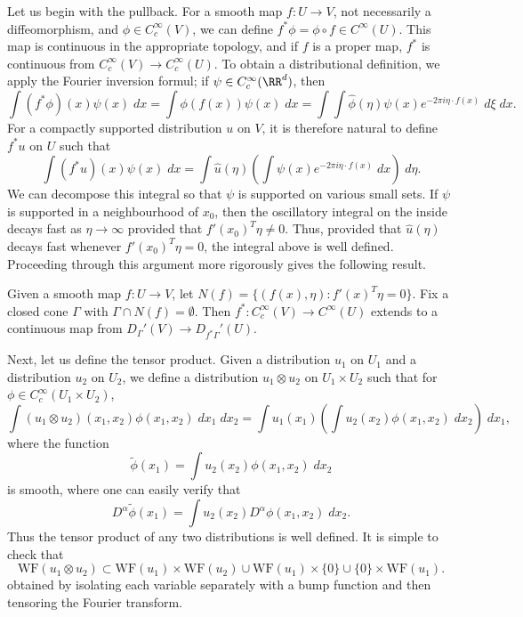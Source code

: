 Let us begin with the pullback. For a smooth map $f: U \to V$, not necessarily a diffeomorphism, and $\phi \in C_c^\infty(V)$, we can define $f^* \phi = \phi \circ f \in C^\infty(U)$. This map is continuous in the appropriate topology, and if $f$ is a proper map, $f^*$ is continuous from $C_c^\infty(V) \to C_c^\infty(U)$. To obtain a distributional definition, we apply the Fourier inversion formul; if $\psi \in C_c^\infty(\RR^d)$, then
%
\[ \int (f^* \phi)(x) \psi(x)\; dx = \int \phi(f(x)) \psi(x)\; dx = \int \int \widehat{\phi}(\eta) \psi(x) e^{-2 \pi i \eta \cdot f(x)}\; d\xi\; dx. \]
%
For a compactly supported distribution $u$ on $V$, it is therefore natural to define $f^* u$ on $U$ such that
%
\[ \int (f^* u)(x) \psi(x)\; dx = \int \widehat{u}(\eta) \left( \int \psi(x) e^{-2 \pi i \eta \cdot f(x)}\; dx \right)\; d\eta. \]
%
We can decompose this integral so that $\psi$ is supported on various small sets. If $\psi$ is supported in a neighbourhood of $x_0$, then the oscillatory integral on the inside decays fast as $\eta \to \infty$ provided that $f'(x_0)^T \eta \neq 0$. Thus, provided that $\widehat{u}(\eta)$ decays fast whenever $f'(x_0)^T \eta = 0$, the integral above is well defined. Proceeding through this argument more rigorously gives the following result.

\begin{theorem}
    Given a smooth map $f: U \to V$, let $N(f) = \{ (f(x),\eta): f'(x)^T \eta = 0 \}$. Fix a closed cone $\Gamma$ with $\Gamma \cap N(f) = \emptyset$. Then $f^*: C_c^\infty(V) \to C^\infty(U)$ extends to a continuous map from $D_\Gamma'(V) \to D_{f^* \Gamma}'(U)$.
\end{theorem}

Next, let us define the tensor product. Given a distribution $u_1$ on $U_1$ and a distribution $u_2$ on $U_2$, we define a distribution $u_1 \otimes u_2$ on $U_1 \times U_2$ such that for $\phi \in C_c^\infty(U_1 \times U_2)$,
%
\[ \int (u_1 \otimes u_2)(x_1,x_2) \phi(x_1,x_2)\; dx_1\; dx_2 = \int u_1(x_1) \left( \int u_2(x_2) \phi(x_1,x_2)\; dx_2 \right)\; dx_1, \]
%
where the function
%
\[ \tilde{\phi}(x_1) = \int u_2(x_2) \phi(x_1,x_2)\; dx_2 \]
%
is smooth, where one can easily verify that
%
\[ D^\alpha \tilde{\phi}(x_1) = \int u_2(x_2) D^\alpha \phi(x_1,x_2)\; dx_2. \]
%
Thus the tensor product of any two distributions is well defined. It is simple to check that
%
\[ \text{WF}(u_1 \otimes u_2) \subset \text{WF}(u_1) \times \text{WF}(u_2) \cup \text{WF}(u_1) \times \{ 0 \} \cup \{ 0 \} \times \text{WF}(u_1). \]
%
obtained by isolating each variable separately with a bump function and then tensoring the Fourier transform.

